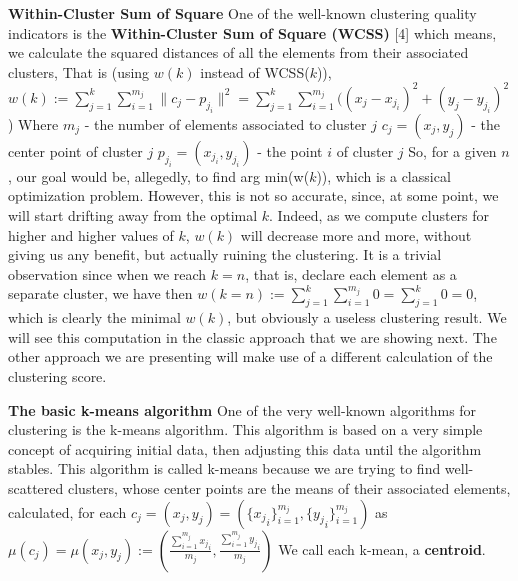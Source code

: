 \documentclass[12pt]{article}
\begin{document}
\textbf{\large Within-Cluster Sum of Square} \newline
One of the well-known clustering quality indicators is the \textbf{Within-Cluster Sum of Square (WCSS)} [4] \newline
which means, we calculate the squared distances of all the elements from their associated clusters, \newline
That is (using $w(k)$ instead of WCSS($k$)), \newline
\( w(k):= \sum_{j=1}^{k} \sum_{i=1}^{m_j} \lVert c_j - p_{j_i} \rVert^2=\sum_{j=1}^{k} \sum_{i=1}^{m_j} ((x_j - x_{j_i})^2+(y_j - y_{j_i})^2 \)) \newline
Where \newline
$m_j$ - the number of elements associated to cluster \( j \) \newline
$c_j=(x_j,y_j)$ - the center point of cluster \( j \) \newline
$p_{j_i}=(x_{j_i},y_{j_i})$ - the point $i$ of cluster \( j \) \newline
So, for a given $n$, our goal would be, allegedly, to find arg min(w($k$)), which is a classical optimization problem. \newline
However, this is not so accurate, since, at some point, we will start drifting away from the optimal $k$. \newline
Indeed, as we compute clusters for higher and higher values of $k$, $w(k)$ will decrease more and more, without giving us any benefit, but actually ruining the clustering. \newline
It is a trivial observation since when we reach \( k=n \), that is, declare each element as a separate cluster, we have then  \( w(k=n):= \sum_{j=1}^{k} \sum_{i=1}^{m_j} 0=\sum_{j=1}^{k} 0=0 \),
which is clearly the minimal $w(k)$, but obviously a useless clustering result. \newline
We will see this computation in the classic approach that we are showing next. The other approach we are presenting will make use of a different calculation of the clustering score. 

\newpage
\textbf{\large The basic k-means algorithm} \newline
One of the very well-known algorithms for clustering is the k-means algorithm. \newline
This algorithm is based on a very simple concept of acquiring initial data, 
then adjusting this data until the algorithm stables. This algorithm is called k-means 
because we are trying to find well-scattered clusters, whose center points are the means of their associated elements, calculated, for each $c_j=(x_j,y_j)=(\{{{x_j}_i}\}_{i=1}^{m_j},\{{{y_j}_i}\}_{i=1}^{m_j})$ as 
$\mu(c_j)=\mu(x_j,y_j):=(\frac{\sum_{i=1}^{m_j}{{x_j}_i}}{m_j},\frac{\sum_{i=1}^{m_j}{{y_j}_i}}{m_j})$ \newline
We call each k-mean, a \textbf{centroid}. \newline
\end{document}
